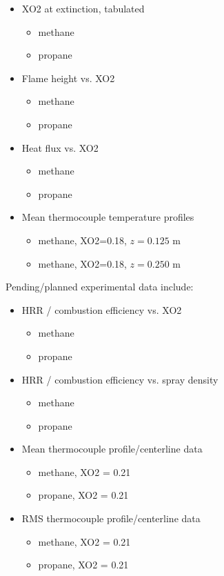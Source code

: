 \documentclass{article}
\begin{document}
\begin{itemize}
	\item XO2 at extinction, tabulated
	\begin{itemize}
		\item methane
		\item propane
	\end{itemize}
	\item Flame height vs. XO2
	\begin{itemize}
		\item methane
		\item propane
	\end{itemize}
	\item Heat flux vs. XO2
	\begin{itemize}
		\item methane
		\item propane
	\end{itemize}
	\item Mean thermocouple temperature profiles
	\begin{itemize}
		\item methane, XO2=0.18, $z = 0.125$ m
		\item methane, XO2=0.18, $z = 0.250$ m
	\end{itemize}
\end{itemize}

Pending/planned experimental data include:

\begin{itemize}
	\item HRR / combustion efficiency vs. XO2
	\begin{itemize}
		\item methane
		\item propane
	\end{itemize}
	\item HRR / combustion efficiency vs. spray density
	\begin{itemize}
		\item methane
		\item propane
	\end{itemize}
	\item Mean thermocouple profile/centerline data
	\begin{itemize}
		\item methane, XO2 = 0.21
		\item propane, XO2 = 0.21
	\end{itemize}
	\item RMS thermocouple profile/centerline data
	\begin{itemize}
		\item methane, XO2 = 0.21
		\item propane, XO2 = 0.21
	\end{itemize}
\end{itemize}




\end{document}
